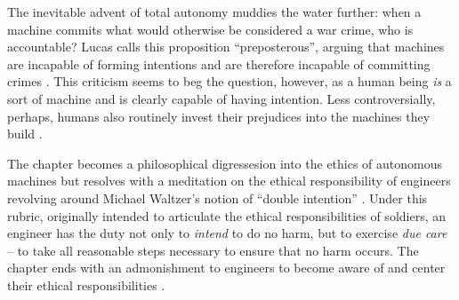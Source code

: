 The inevitable advent of total autonomy muddies the water further: when a machine commits what would otherwise be considered a war crime, who is accountable? Lucas calls this proposition ``preposterous'', arguing that machines are incapable of forming intentions and are therefore incapable of committing crimes \cite[p.2868]{Valavanis2015bz}. This criticism seems to beg the question, however, as a human being \emph{is} a sort of machine and is clearly capable of having intention. Less controversially, perhaps, humans also routinely invest their prejudices into the machines they build \cite{Greenwald1998,Caliskan2017}. 

The chapter becomes a philosophical digressesion into the ethics of autonomous machines but resolves with a meditation on the ethical responsibility of engineers \cite[p.2873]{Valavanis2015bz} revolving around Michael Waltzer's notion of ``double intention'' \cite{Waltzer}. Under this rubric, originally intended to articulate the ethical responsibilities of soldiers, an engineer has the duty not only to \emph{intend} to do no harm, but to exercise \emph{due care} \cite{Lucas2011} -- to take all reasonable steps necessary to ensure that no harm occurs. The chapter ends with an admonishment to engineers to become aware of and center their ethical responsibilities \cite[p.2974]{Valavanis2015bz}.


\setlength{\unitlength}{\savedunitlength}
